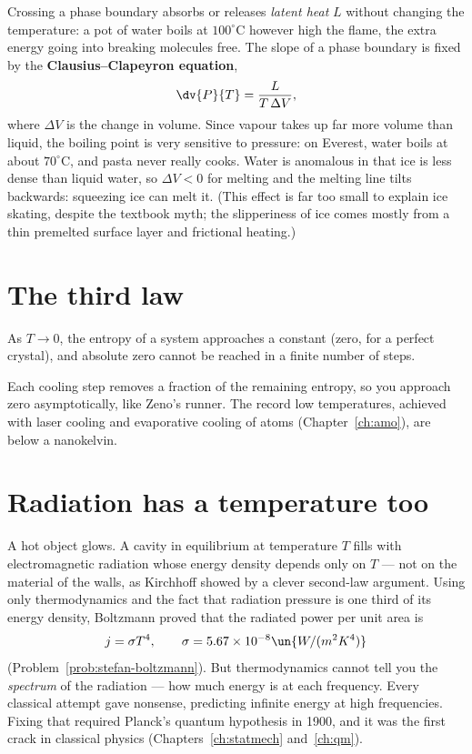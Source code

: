 Crossing a phase boundary absorbs or releases \emph{latent heat} $L$ without changing the temperature: a pot of water boils at $100^\circ\text{C}$ however high the flame, the extra energy going into breaking molecules free. The slope of a phase boundary is fixed by the \textbf{Clausius--Clapeyron equation},
\[
  \dv{P}{T} = \frac{L}{T\,\Delta V},
\]
where $\Delta V$ is the change in volume. Since vapour takes up far more volume than liquid, the boiling point is very sensitive to pressure: on Everest, water boils at about $70^\circ\text{C}$, and pasta never really cooks. Water is anomalous in that ice is less dense than liquid water, so $\Delta V<0$ for melting and the melting line tilts backwards: squeezing ice can melt it. (This effect is far too small to explain ice skating, despite the textbook myth; the slipperiness of ice comes mostly from a thin premelted surface layer and frictional heating.)

\section{The third law}

\begin{law}
As $T\to0$, the entropy of a system approaches a constant (zero, for a perfect crystal), and absolute zero cannot be reached in a finite number of steps.
\end{law}
Each cooling step removes a fraction of the remaining entropy, so you approach zero asymptotically, like Zeno's runner. The record low temperatures, achieved with laser cooling and evaporative cooling of atoms (Chapter~\ref{ch:amo}), are below a nanokelvin.

\section{Radiation has a temperature too}

A hot object glows. A cavity in equilibrium at temperature $T$ fills with electromagnetic radiation whose energy density depends only on $T$ --- not on the material of the walls, as Kirchhoff showed by a clever second-law argument. Using only thermodynamics and the fact that radiation pressure is one third of its energy density, Boltzmann proved that the radiated power per unit area is
\[
  j = \sigma T^{4},\qquad \sigma = 5.67\times10^{-8}\un{W/(m^2K^4)}
\]
(Problem~\ref{prob:stefan-boltzmann}). But thermodynamics cannot tell you the \emph{spectrum} of the radiation --- how much energy is at each frequency. Every classical attempt gave nonsense, predicting infinite energy at high frequencies. Fixing that required Planck's quantum hypothesis in 1900, and it was the first crack in classical physics (Chapters~\ref{ch:statmech} and~\ref{ch:qm}).

